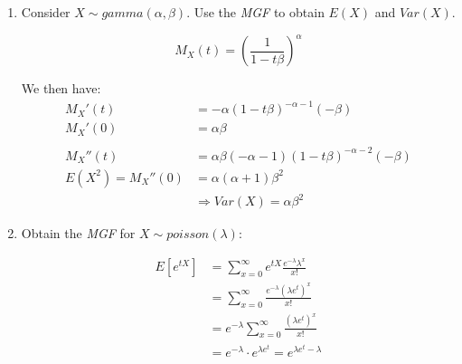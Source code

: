 \documentclass{article}
\begin{document}
\begin{enumerate}
    \item Consider $X\sim gamma(\alpha,\beta)$. Use the \textit{MGF} to obtain $E(X)$ and $Var(X)$.
    
    \begin{equation*}
        M_X(t) = \left(\frac{1}{1-t\beta}\right)^\alpha
    \end{equation*}
    
    We then have:
    \begin{equation*}
    \begin{split}
        M_X'(t) &= -\alpha(1-t\beta)^{-\alpha-1}(-\beta)\\
        M_X'(0) &= \alpha\beta\\
        &\text{ }\\
        M_X''(t) &= \alpha\beta(-\alpha-1)(1-t\beta)^{-\alpha-2}(-\beta)\\
        E(X^2) = M_X''(0) &= \alpha(\alpha+1)\beta^2\\
        &\Rightarrow Var(X) = \alpha \beta^2
    \end{split}
    \end{equation*}
    
    \item Obtain the \textit{MGF} for $X \sim poisson(\lambda)$:
    
    \begin{equation*}
        \begin{split}
            E[e^{tX}] &= \sum_{x=0}^\infty e^{tX} \frac{e^{-\lambda}\lambda^x}{x!}\\
                    &= \sum_{x=0}^\infty \frac{e^{-\lambda}(\lambda e^t)^x}{x!}\\
                    &= e^{-\lambda} \sum_{x=0}^\infty \frac{(\lambda e^t)^x}{x!}\\
                    &= e^{-\lambda} \cdot e^{\lambda e^{t}} = e^{\lambda e^t - \lambda}
        \end{split}
    \end{equation*}
    
\end{enumerate}
\end{document}
